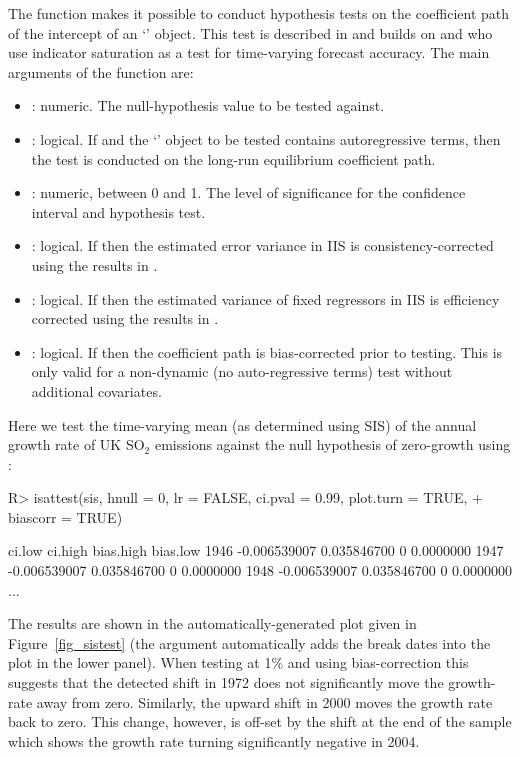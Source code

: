 \documentclass[article,nojss]{jss}
\begin{document}
The function  makes it possible to conduct hypothesis
tests on the coefficient path of the intercept of an `'
object. This test is described in \cite{pretis2015istest} and builds
on \cite{ericsson2013biased} and \cite{pretis2015testing} who use
indicator saturation as a test for time-varying forecast accuracy. The
main arguments of the  function are:
%
\begin{itemize}
\item {}: numeric. The null-hypothesis value to be tested against.

\item {}: logical. If  and the `' object to be tested contains autoregressive terms, then the test is conducted on the long-run equilibrium coefficient path.

\item {}: numeric, between 0 and 1. The level of significance for the confidence interval and hypothesis test.
	
\item {}: logical. If  then the estimated error variance in IIS is consistency-corrected using the results in \cite{johansen2016asymptotic}.

\item {}: logical. If  then the estimated variance of fixed regressors in IIS is efficiency corrected using the results in \cite{johansen2016asymptotic}.
	
\item {}: logical. If  then the coefficient path is bias-corrected prior to testing. This is only valid for a non-dynamic (no auto-regressive terms) test without additional covariates.
\end{itemize}
%
Here we test the time-varying mean (as determined using SIS) of the annual growth rate of UK SO$_2$ emissions against the null hypothesis of zero-growth using :
%
\begin{CodeChunk}
\begin{CodeInput}  
R> isattest(sis, hnull = 0, lr = FALSE, ci.pval = 0.99, plot.turn = TRUE,
+    biascorr = TRUE)
\end{CodeInput}
\begin{CodeOutput}
           ci.low      ci.high bias.high   bias.low
1946 -0.006539007  0.035846700         0  0.0000000
1947 -0.006539007  0.035846700         0  0.0000000
1948 -0.006539007  0.035846700         0  0.0000000
...
\end{CodeOutput}
\end{CodeChunk}
%
The results are shown in the automatically-generated plot given in Figure~\ref{fig_sistest} (the  argument automatically adds the break dates into the plot in the lower panel). When testing at 1\% and using bias-correction this suggests that the detected shift in 1972 does not significantly move the growth-rate away from zero. Similarly, the upward shift in 2000 moves the growth rate back to zero. This change, however, is off-set by the shift at the end of the sample which shows the growth rate turning significantly negative in 2004.
\end{document}
